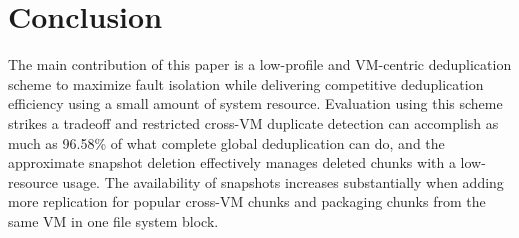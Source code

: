 \section{Conclusion}
\label{sect:conclusion}
The main contribution of this paper is a low-profile and VM-centric deduplication scheme to 
maximize fault isolation while delivering competitive deduplication efficiency using
a small amount of system resource.
Evaluation using  this scheme strikes a tradeoff and restricted cross-VM duplicate detection
can accomplish as much as 96.58\% of what complete global
deduplication can do, and the approximate snapshot deletion effectively manages deleted chunks with a 
low-resource usage.  The availability of snapshots increases substantially when
adding more replication for popular cross-VM chunks and packaging chunks from the same 
VM in one file system block.


